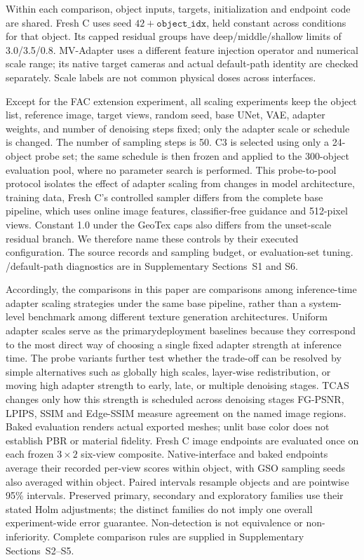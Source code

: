 \documentclass[times,twocolumn,final]{elsarticle}
\providecommand{\DIFadd}[1]{{\protect\color{blue} \sf #1}} %
\providecommand{\DIFdel}[1]{{\protect\color{red} \scriptsize #1}} %
\providecommand{\DIFaddbegin}{} %
\providecommand{\DIFaddend}{} %
\providecommand{\DIFdelbegin}{} %
\providecommand{\DIFdelend}{} %
\begin{document}
\DIFadd{Within each comparison, object inputs, targets, initialization and endpoint code are shared. Fresh C uses seed $42+\texttt{object\_idx}$, held constant across conditions for that object. Its capped residual groups have deep/middle/shallow limits of 3.0/3.5/0.8}\DIFaddend . \DIFaddbegin \DIFadd{MV-Adapter uses a different feature injection operator and numerical scale range; its native target cameras and actual default-path identity are checked separately. Scale labels are not common physical doses across interfaces.
}\DIFaddend

\DIFdelbegin \DIFdel{Except for the FAC extension experiment, all scaling experiments keep the object list, reference image, target views, random seed, base UNet, VAE, adapter weights, and number of denoising steps fixed; only the adapter scale or schedule is changed. The number of sampling steps is 50. C3 is selected using only a 24-object probe set; the same schedule is then frozen and applied to the 300-object evaluation pool, where no parameter search is performed. This probe-to-pool protocol isolates the effect of adapter scaling from changes in model architecture, training data, }\DIFdelend \DIFaddbegin \DIFadd{Fresh C's controlled sampler differs from the complete base pipeline, which uses online image features, classifier-free guidance and 512-pixel views. Constant 1.0 under the GeoTex caps also differs from the unset-scale residual branch. We therefore name these controls by their executed configuration. The source records and }\DIFaddend sampling\DIFdelbegin \DIFdel{budget, or evaluation-set tuning. }\DIFdelend \DIFaddbegin \DIFadd{/default-path diagnostics are in Supplementary Sections~S1 and S6.
}\DIFaddend

\DIFdelbegin \DIFdel{Accordingly, the comparisons in this paper are comparisons among inference-time adapter scaling strategies under the same base pipeline, rather than a system-level benchmark among different texture generation architectures. Uniform adapter scales serve as the primarydeployment baselines because they correspond to the most direct way of choosing a single fixed adapter strength at inference time. The probe variants further test whether the trade-off can be resolved by simple alternatives such as globally high scales, layer-wise redistribution, or moving high adapter strength to early, late, or multiple denoising stages. TCAS changes only how this strength is scheduled across denoising stages}\DIFdelend \DIFaddbegin \DIFadd{FG-PSNR, LPIPS, SSIM and Edge-SSIM measure agreement on the named image regions. Baked evaluation renders actual exported meshes; unlit base color does not establish PBR or material fidelity. Fresh C image endpoints are evaluated once on each frozen $3\times2$ six-view composite. Native-interface and baked endpoints average their recorded per-view scores within object, with GSO sampling seeds also averaged within object. Paired intervals resample objects and are pointwise 95\% intervals. Preserved primary, secondary and exploratory families use their stated Holm adjustments; the distinct families do not imply one overall experiment-wide error guarantee. Non-detection is not equivalence or non-inferiority. Complete comparison rules are supplied in Supplementary Sections~S2--S5}\DIFaddend .
\end{document}
